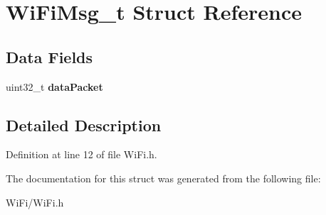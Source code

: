 \hypertarget{struct_wi_fi_msg__t}{}\section{Wi\+Fi\+Msg\+\_\+t Struct Reference}
\label{struct_wi_fi_msg__t}
\subsection*{Data Fields}
\begin{DoxyCompactItemize}
\item 
\hypertarget{struct_wi_fi_msg__t_a4bf8d6655a29d5733aa6a00567e49874}{}uint32\+\_\+t {\bfseries data\+Packet}\label{struct_wi_fi_msg__t_a4bf8d6655a29d5733aa6a00567e49874}

\end{DoxyCompactItemize}


\subsection{Detailed Description}


Definition at line 12 of file Wi\+Fi.\+h.



The documentation for this struct was generated from the following file\+:\begin{DoxyCompactItemize}
\item 
Wi\+Fi/Wi\+Fi.\+h\end{DoxyCompactItemize}
